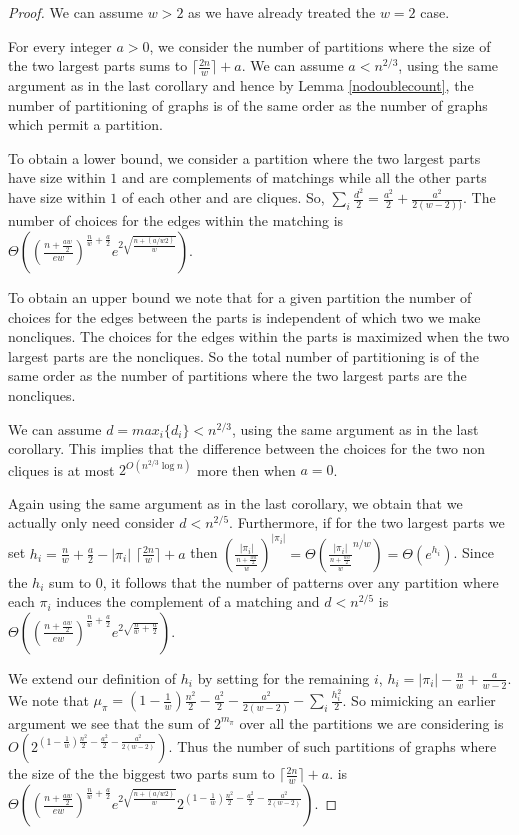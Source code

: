 \documentclass[12pt]{article}
\theoremstyle{definition}
\begin{document}
\begin{proof} 
We can assume $w>2$ as we have already treated the $w=2$ case. 

For every integer $a>0$, we consider the number of partitions where the 
size  of the two largest parts sums to $\lceil \frac{2n}{w} \rceil+a$. 
We can assume $a<n^{2/3}$, using the same argument as in the last corollary and hence by Lemma \ref{nodoublecount}, the number of 
partitioning of graphs is of the same order as the number of graphs which permit a partition. 


To obtain a lower bound, we consider a partition where the two largest parts have size within $1$ and are complements of matchings
while   all the other parts have size within $1$ of each other and are cliques. 
So, $\sum_i \frac{d^2}{2}= \frac{a^2}{2}+\frac{a^2}{2(w-2))}$. The number of choices for the edges within the matching 
is $\Theta((\frac{n+\frac{aw}{2}}{ew})^{\frac{n}{w}+\frac{a}{2}}e^{2\sqrt{\frac{n+(a/w2)}{w}}})$.

To obtain an upper  bound we note that for   a given partition the number of choices for the edges between the parts is independent of which two we make 
noncliques. The choices for the edges within the parts is maximized when the two largest parts are the noncliques. So the total number of partitioning is 
of the same order as the number of partitions where the two largest parts are the noncliques. 


We can assume $d=max_i \{d_i\}<n^{2/3}$, using the same argument as in the last corollary. 
This implies that  the  difference between the choices for the two non cliques 
is at most $2^{O(n^{2/3}\log n)}$ more then when $a=0$. 

Again using the same argument as in the last corollary, we obtain that we actually only need consider $d<n^{2/5}$. 
Furthermore, if for the two largest parts  we set $h_i=\frac{n}{w}+\frac{a}{2} -|\pi_i|$ $\lceil \frac{2n}{w} \rceil+a$
then  $(\frac{|\pi_i|}{\frac{n+\frac{wa}{2}}{w}})^{|\pi_i|}=\Theta(\frac{|\pi_i|}{\frac{n+\frac{wa}{2}}{w}}^{n/w})=\Theta(e^{h_i})$.
Since the $h_i$ sum to 0, it follows that the number of patterns over  any partition where each $\pi_i$ induces the 
complement of a matching  and $d< n^{2/5}$ is $\Theta((\frac{n+\frac{aw}{2}}{ew})^{\frac{n}{w}+\frac{a}{2}}e^{2\sqrt{\frac{n}{w}+\frac{a}{2}}})$. 

We extend our definition of $h_i$ by setting  for the remaining $i$, $h_i=|\pi_i|-\frac{n}{w}+\frac{a}{w-2}$. 
We note that $\mu_\pi=(1-\frac{1}{w})\frac{n^2}{2}-\frac{a^2}{2}-\frac{a^2}{2(w-2)}-\sum_i \frac{h_i^2}{2}$. 
So mimicking an earlier argument we see that the sum of $2^{m_\pi}$ over all the partitions we are considering is 
$O(2^{(1-\frac{1}{w})\frac{n^2}{2}-\frac{a^2}{2}-\frac{a^2}{2(w-2)}})$. 
Thus the number of such partitions of graphs where the size of the the  biggest two parts  sum to $\lceil \frac{2n}{w} \rceil+a$. 
 is  
$\Theta((\frac{n+\frac{aw}{2}}{ew})^{\frac{n}{w}+\frac{a}{2}}e^{2\sqrt{\frac{n+(a/w2)}{w}}}2^{(1-\frac{1}{w})\frac{n^2}{2}-\frac{a^2}{2}-\frac{a^2}{2(w-2)}})$.


\end{proof}
\end{document}
